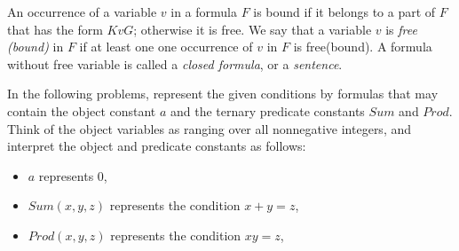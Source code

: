 An occurrence of a variable $v$ in a formula $F$ is bound if it belongs to a part of $F$ that has the form $KvG$; otherwise it is free. We say that a variable $v$ is \textit{free (bound)} in $F$ if at least one one occurrence of $v$ in $F$ is free(bound). A formula without free variable is called a \textit{closed formula}, or a \textit{sentence}. 

In the following problems, represent the given conditions by formulas that may contain the object constant $a$ and the ternary predicate constants $Sum$ and $Prod$. Think of the object variables as ranging over all nonnegative integers, and interpret the object and predicate constants as follows:
\begin{itemize}
\item $a$ represents 0, 
\item $Sum(x, y, z)$ represents the condition $x + y = z$, 
\item $Prod(x, y, z)$ represents the condition $xy = z$, 
\end{itemize}

